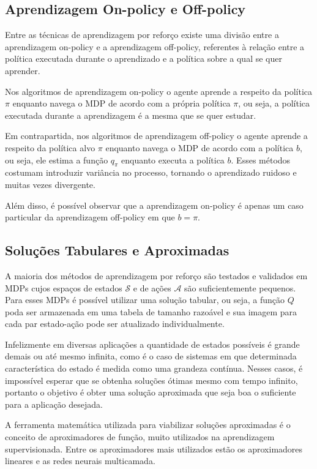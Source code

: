 \subsection{Aprendizagem On-policy e Off-policy}
\label{subsec:on-off-policy}
Entre as técnicas de aprendizagem por reforço existe uma divisão entre a aprendizagem on-policy e a aprendizagem off-policy, referentes à relação entre a política executada durante o aprendizado e a política sobre a qual se quer aprender.

Nos algoritmos de aprendizagem on-policy o agente aprende a respeito da política $\pi$ enquanto navega o MDP de acordo com a própria política $\pi$, ou seja, a política executada durante a aprendizagem é a mesma que se quer estudar.

Em contrapartida, nos algoritmos de aprendizagem off-policy o agente aprende a respeito da política alvo $\pi$ enquanto navega o MDP de acordo com a política $b$, ou seja, ele estima a função $q_{\pi}$ enquanto executa a política $b$. Esses métodos costumam introduzir variância no processo, tornando o aprendizado ruidoso e muitas vezes divergente.

Além disso, é possível observar que a aprendizagem on-policy é apenas um caso particular da aprendizagem off-policy em que $b = \pi$.

\subsection{Soluções Tabulares e Aproximadas}

A maioria dos métodos de aprendizagem por reforço são testados e validados em MDPs cujos espaços de estados $\mathcal{S}$ e de ações $\mathcal{A}$ são suficientemente pequenos. Para esses MDPs é possível utilizar uma solução tabular, ou seja, a função $Q$ poda ser armazenada em uma tabela de tamanho razoável e sua imagem para cada par estado-ação pode ser atualizado individualmente.

Infelizmente em diversas aplicações a quantidade de estados possíveis é grande demais ou até mesmo infinita, como é o caso de sistemas em que determinada característica do estado é medida como uma grandeza contínua. Nesses casos, é impossível esperar que se obtenha soluções ótimas mesmo com tempo infinito, portanto o objetivo é obter uma solução aproximada que seja boa o suficiente para a aplicação desejada.

A ferramenta matemática utilizada para viabilizar soluções aproximadas é o conceito de aproximadores de função, muito utilizados na aprendizagem supervisionada. Entre os aproximadores mais utilizados estão os aproximadores lineares e as redes neurais multicamada.


